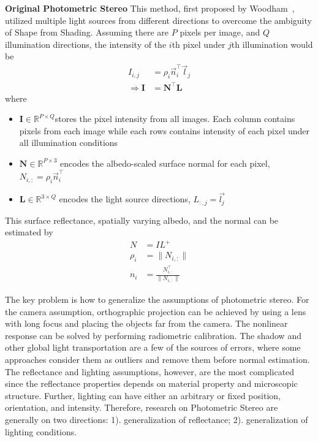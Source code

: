 \textbf{Original Photometric Stereo} This method, first proposed by Woodham~\cite{woodham1980photometric}, utilized multiple light sources from different directions to overcome the ambiguity of Shape from Shading. Assuming there are $P$ pixels per image, and $Q$ illumination directions, the intensity of the $i$th pixel under $j$th illumination would be
\begin{align*}
I_{i,j} &= \rho_i\vec{n}_i^\top \vec{l}_j\\
\Rightarrow\mathbf{I} &= \mathbf{N}^\top \mathbf{L}
\end{align*}
where
\begin{itemize}
\item $\mathbf{I}\in \mathbb{R}^{P\times Q} $stores the pixel intensity from all images. Each column contains pixels from each image while each rows contains intensity of each pixel under all illumination conditions
\item $\mathbf{N}\in \mathbb{R}^{P\times3}$ encodes the albedo-scaled surface normal for each pixel, \ie $N_{i, :} = \rho_i\vec{n}_i^\top$
\item $\mathbf{L} \in \mathbb{R}^{3\times Q}$ encodes the light source directions, \ie $L_{:, j} = \vec{l_j}$
\end{itemize}
This surface reflectance, \ie spatially varying albedo, and the normal can be estimated by
\begin{align*}
N &= IL^{+}\\
\rho_i &= \|N_{i,:}\|\\
n_i &= \frac{N_{i,:}^\top}{\|N_{i,:}\|}
\end{align*}

The key problem is how to generalize the assumptions of photometric stereo. For the camera assumption, orthographic projection can be achieved by using a lens with long focus and placing the objects far from the camera. The nonlinear response can be solved by performing radiometric calibration. The shadow and other global light transportation are a few of the sources of errors, where some approaches consider them as outliers and remove them before normal estimation. The reflectance and lighting assumptions, however, are the most complicated since the reflectance properties depends on material property and microscopic structure. Further, lighting can have either an arbitrary or fixed position, orientation, and intensity. Therefore, research on Photometric Stereo are generally on two directions: 1). generalization of reflectance; 2). generalization of lighting conditions.

